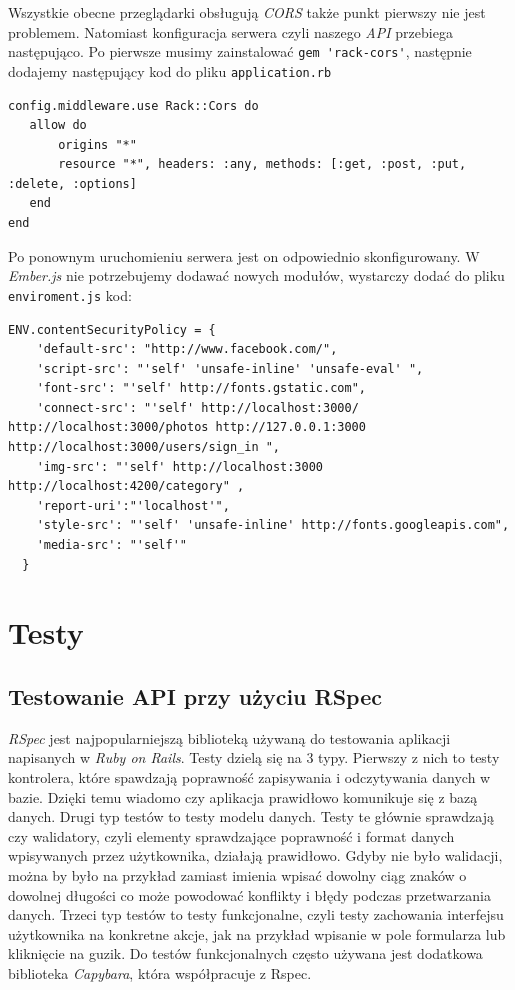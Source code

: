 \documentclass[brudnopis]{xmgr}
\begin{document}
 Wszystkie obecne przeglądarki obsługują \textit{CORS} także punkt pierwszy nie jest problemem. Natomiast konfiguracja serwera czyli naszego \textit{API} przebiega następująco. Po pierwsze musimy zainstalować \verb|gem 'rack-cors'|, następnie dodajemy następujący kod do pliku \verb|application.rb|
\begin{verbatim}
config.middleware.use Rack::Cors do
   allow do
       origins "*"
       resource "*", headers: :any, methods: [:get, :post, :put, :delete, :options]
   end
end
\end{verbatim}
Po ponownym uruchomieniu serwera jest on odpowiednio skonfigurowany.
\newline\indent W \textit{Ember.js} nie potrzebujemy dodawać nowych modułów, wystarczy dodać do pliku \verb|enviroment.js| kod:
\begin{verbatim}
ENV.contentSecurityPolicy = {
    'default-src': "http://www.facebook.com/",
    'script-src': "'self' 'unsafe-inline' 'unsafe-eval' ",
    'font-src': "'self' http://fonts.gstatic.com", 
    'connect-src': "'self' http://localhost:3000/ http://localhost:3000/photos http://127.0.0.1:3000 http://localhost:3000/users/sign_in ",
    'img-src': "'self' http://localhost:3000 http://localhost:4200/category" ,
    'report-uri':"'localhost'",
    'style-src': "'self' 'unsafe-inline' http://fonts.googleapis.com", 
    'media-src': "'self'"
  }
\end{verbatim}
\chapter{Testy}
\section{Testowanie API przy użyciu RSpec}
\textit{RSpec} jest najpopularniejszą biblioteką używaną do testowania aplikacji napisanych w \textit{Ruby on Rails}. Testy dzielą się na 3 typy. Pierwszy z nich to testy kontrolera, które spawdzają poprawność zapisywania i odczytywania danych w bazie. Dzięki temu wiadomo czy aplikacja prawidłowo komunikuje się z bazą danych. Drugi typ testów to testy modelu danych. Testy te głównie sprawdzają czy walidatory, czyli elementy sprawdzające poprawność i format danych wpisywanych przez użytkownika, działają prawidłowo. Gdyby nie było walidacji, można by było na przykład zamiast imienia wpisać dowolny ciąg znaków o dowolnej długości co może powodować konflikty i błędy podczas przetwarzania danych. Trzeci typ testów to testy funkcjonalne, czyli testy zachowania interfejsu użytkownika na konkretne akcje, jak na przykład wpisanie w pole formularza lub kliknięcie na guzik. Do testów funkcjonalnych często używana jest dodatkowa biblioteka \textit{Capybara}, która współpracuje z Rspec. 
\end{document}
